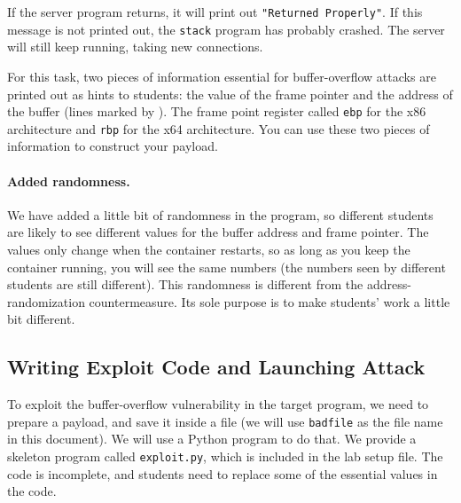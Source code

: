 If the server program returns, it will print out \texttt{"Returned Properly"}.
If this message is not printed out, the \texttt{stack} program has probably crashed. 
The server will still keep running, taking new connections.  

For this task, two pieces of information essential for buffer-overflow 
attacks are printed out as hints to students: 
the value of the frame pointer and the address
of the buffer (lines marked by ). The frame point register 
called \texttt{ebp} for the x86 architecture and \texttt{rbp} for the x64 architecture.
You can use these two pieces of information to construct 
your payload. 


\paragraph{Added randomness.} We have added a little bit of randomness
in the program, so different students are likely to see different values
for the buffer address and frame pointer. The values only change 
when the container restarts, so as long as you keep the 
container running, you will see the same numbers (the numbers 
seen by different students are still different). This randomness
is different from the address-randomization countermeasure. Its sole
purpose is to make students' work a little bit different. 


\subsection{Writing Exploit Code and Launching Attack} 

To exploit the buffer-overflow vulnerability in the target program,
we need to prepare a payload, and save it inside a file (we will use 
\texttt{badfile} as the file name in this document). 
We will use a Python program to do that.
We provide a skeleton program called \texttt{exploit.py}, which
is included in the lab setup file. 
The code is incomplete, and students need to replace some of the essential 
values in the code. 


\newcommand{\needtochange}{\ding{73} Need to change \ding{73}}


